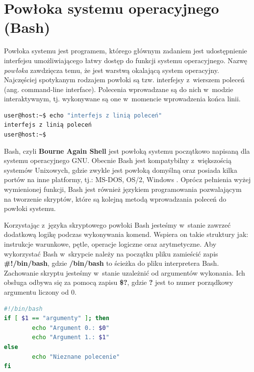 \section{Powłoka systemu operacyjnego (Bash)}
Powłoka systemu jest programem, którego głównym zadaniem jest udostępnienie interfejsu umożliwiającego łatwy dostęp do funkcji systemu operacyjnego. Nazwę \textit{powłoka} zawdzięcza temu, że jest warstwą okalającą system operacyjny. Najczęściej spotykanym rodzajem powłoki są tzw. interfejsy z~wierszem poleceń (ang. command-line interface). Polecenia wprowadzane są do nich w~modzie interaktywnym, tj. wykonywane są one w~momencie wprowadzenia końca linii.

\begin{lstlisting}[language=bash,language=Cmd,caption={Komenda wypisująca tekst na standardowe wyjście wykonana z~linii poleceń}]
user@host:~$ echo "interfejs z linią poleceń"
interfejs z linią poleceń
user@host:~$
\end{lstlisting}

Bash, czyli \textbf{Bourne Again Shell} jest powłoką systemu początkowo napisaną dla systemu operacyjnego GNU. Obecnie Bash jest kompatybilny z~większością systemów Unixowych, gdzie zwykle jest powłoką domyślną oraz posiada kilka portów na inne platformy, tj.: MS-DOS, OS/2, Windows \cite{BashMan}. Oprócz pełnienia wyżej wymienionej funkcji, Bash jest również językiem programowania pozwalającym na tworzenie skryptów, które są kolejną metodą wprowadzania poleceń do powłoki systemu.\par
Korzystając z~języka skryptowego powłoki Bash jesteśmy w~stanie zawrzeć dodatkową logikę podczas wykonywania komend. Wspiera on takie struktury jak: instrukcje warunkowe, pętle, operacje logiczne oraz arytmetyczne. Aby wykorzystać Bash w~skrypcie należy na początku pliku zamieścić zapis \textbf{\#!/bin/bash}, gdzie \textbf{/bin/bash} to ścieżka do pliku interpretera Bash. Zachowanie skryptu jesteśmy w~stanie uzależnić od argumentów wykonania. Ich obsługa odbywa się za pomocą zapisu \textbf{\$?}, gdzie \textbf{?} jest to numer porządkowy argumentu liczony od 0.

\begin{lstlisting}[label={lst:prostySkrypt},language=bash,caption={Skrypt wykorzystujący argumenty wejściowe, instrukcję warunkową oraz polecenie echo}]
#!/bin/bash
if [ $1 == "argumenty" ]; then
        echo "Argument 0.: $0"
        echo "Argument 1.: $1"
else
        echo "Nieznane polecenie"
fi
\end{lstlisting}

